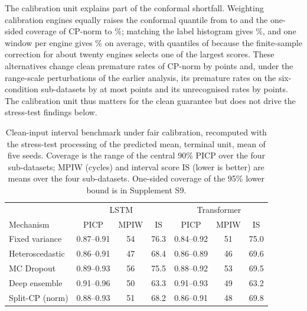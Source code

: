 \documentclass[11pt,a4paper]{article}
\begin{document}
The calibration unit explains part of the conformal shortfall. Weighting calibration engines equally raises the conformal quantile from \RVQAll{} to \RVQEW{} and the one-sided coverage of CP-norm to \RVCovOneEW\%; matching the label histogram gives \RVCovOneLM\%, and one window per engine gives \RVCovOneOPE\% on average, with quantiles of \RVQOPE{} because the finite-sample correction for about twenty engines selects one of the largest scores. These alternatives change clean premature rates of CP-norm by \RVCalCleanPremShift{} points and, under the range-scale perturbations of the earlier analysis, its premature rates on the six-condition sub-datasets by at most \RVCalDriftShiftSix{} points and its unrecognised rates by \RVCalLateShift{} points. The calibration unit thus matters for the clean guarantee but does not drive the stress-test findings below.

\begin{table}[!t]
\caption{Clean-input interval benchmark under fair calibration, recomputed with the stress-test processing of the predicted mean, terminal unit, mean of five seeds. Coverage is the range of the central 90\% PICP over the four sub-datasets; MPIW (cycles) and interval score IS (lower is better) are means over the four sub-datasets. One-sided coverage of the 95\% lower bound is in Supplement S9.}
\label{tab:clean}
\centering\small
\begin{tabular}{lccc|ccc}
\toprule
 & \multicolumn{3}{c|}{LSTM} & \multicolumn{3}{c}{Transformer} \\
Mechanism & PICP & MPIW & IS & PICP & MPIW & IS \\
\midrule
Fixed variance & 0.87--0.91 & 54 & 76.3 & 0.84--0.92 & 51 & 75.0 \\
Heteroscedastic & 0.86--0.91 & 47 & 68.4 & 0.86--0.89 & 46 & 69.6 \\
MC Dropout & 0.89--0.93 & 56 & 75.5 & 0.88--0.92 & 53 & 69.5 \\
Deep ensemble & 0.91--0.96 & 50 & 63.3 & 0.91--0.93 & 49 & 63.2 \\
Split-CP (norm) & 0.88--0.93 & 51 & 68.2 & 0.86--0.91 & 48 & 69.8 \\
\bottomrule
\end{tabular}
\end{table}
\end{document}
